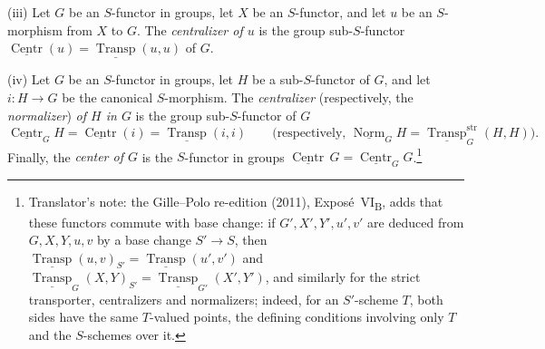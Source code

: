 \smallskip
\noindent\textup{(iii)} Let \(G\) be an \(S\)-functor in groups,
let \(X\) be an \(S\)-functor, and let \(u\) be an \(S\)-morphism from
\(X\) to \(G\). The \emph{centralizer of \(u\)} is the group
sub-\(S\)-functor
\(\underline{\operatorname{Centr}}(u)=\underline{\operatorname{Transp}}(u,u)\)
of \(G\).

\smallskip
\noindent\textup{(iv)} Let \(G\) be an \(S\)-functor in groups,
let \(H\) be a sub-\(S\)-functor of \(G\), and let
\(i:H\to G\) be the canonical \(S\)-morphism. The
\emph{centralizer} (respectively, the \emph{normalizer}) \emph{of \(H\) in
\(G\)} is the group sub-\(S\)-functor of \(G\)
\label{eq:sga3-VIB-6.1-centralizer-normalizer}%
\[
\underline{\operatorname{Centr}}_G H
  =\underline{\operatorname{Centr}}(i)
  =\underline{\operatorname{Transp}}(i,i)
\qquad
\bigl(\text{respectively, }\underline{\operatorname{Norm}}_G H
  =\underline{\operatorname{Transp}}^{\mathrm{str}}_G(H,H)\bigr).
\]
Finally, the \emph{center of \(G\)} is the \(S\)-functor in
groups
\(\underline{\operatorname{Centr}}\,G=\underline{\operatorname{Centr}}_G G\).\footnote{Translator's note: the
Gille--Polo re-edition (2011), Expos\'e~VI\textsubscript{B}, adds that these functors commute with base change: if
\(G',X',Y',u',v'\) are deduced from \(G,X,Y,u,v\) by a base change \(S'\to S\), then
\(\underline{\operatorname{Transp}}(u,v)_{S'}=\underline{\operatorname{Transp}}(u',v')\) and
\(\underline{\operatorname{Transp}}_G(X,Y)_{S'}=\underline{\operatorname{Transp}}_{G'}(X',Y')\), and similarly for
the strict transporter, centralizers and normalizers; indeed, for an \(S'\)-scheme \(T\), both sides have the same
\(T\)-valued points, the defining conditions involving only \(T\) and the \(S\)-schemes over it.}

